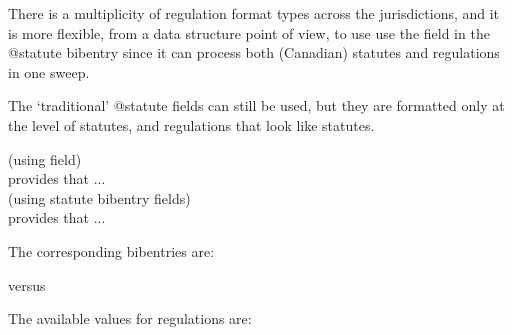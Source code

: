 \p There is a multiplicity of regulation format types across the jurisdictions, and it is more flexible, from a data structure point of view, to use use the  field in the @statute bibentry since it can process both (Canadian) statutes and regulations in one sweep.

\p The `traditional' @statute fields can still be used, but they are formatted only at the level of statutes, and regulations that look like statutes.

\bigskip
(using  field)\\
  provides that ...\\
(using statute bibentry fields) \\
 provides that ...
\par\bigskip

The corresponding bibentries are:

%

versus



\p The available  values for regulations are:

\bigskip

